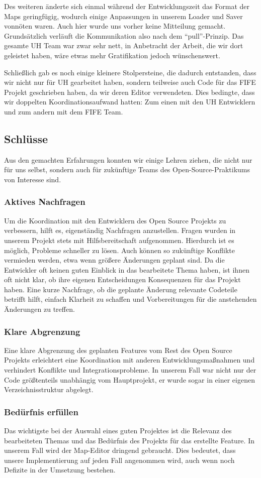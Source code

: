 Des weiteren änderte sich einmal während der Entwicklungszeit das Format der
Maps geringfügig, wodurch einige Anpassungen in unserem Loader und Saver vonnöten
waren. Auch hier wurde uns vorher keine Mitteilung gemacht. Grundsätzlich
verläuft die Kommunikation also nach dem ``pull''-Prinzip. Das gesamte UH Team
war zwar sehr nett, in Anbetracht der Arbeit, die wir dort geleistet haben, wäre
etwas mehr Gratifikation jedoch wünschenswert.

Schließlich gab es noch einige kleinere Stolpersteine, die dadurch entstanden,
dass wir nicht nur für UH gearbeitet haben, sondern teilweise auch Code
für das FIFE Projekt geschrieben haben, da wir deren Editor verwendeten.
Dies bedingte, dass wir doppelten Koordinationsaufwand hatten: Zum einen mit
den UH Entwicklern und zum andern mit dem FIFE Team.


\subsection{Schlüsse}
Aus den gemachten Erfahrungen konnten wir einige Lehren ziehen, die nicht nur
für uns selbst, sondern auch für zukünftige Teams des Open-Source-Praktikums
von Interesse sind.

\subsubsection{Aktives Nachfragen}
Um die Koordination mit den Entwicklern des Open Source Projekts zu verbessern,
hilft es, eigenständig Nachfragen anzustellen. Fragen wurden in
unserem Projekt stets mit Hilfsbereitschaft aufgenommen. Hierdurch ist es möglich,
Probleme schneller zu lösen. Auch können so zukünftige Konflikte vermieden werden,
etwa wenn größere Änderungen geplant sind. Da die Entwickler oft keinen guten
Einblick in das bearbeitete Thema haben, ist ihnen oft nicht klar, ob ihre eigenen
Entscheidungen Konsequenzen für das Projekt haben. Eine kurze Nachfrage, ob die
geplante Änderung relevante Codeteile betrifft hilft, einfach Klarheit zu schaffen
und Vorbereitungen für die anstehenden Änderungen zu treffen.

\subsubsection{Klare Abgrenzung}
Eine klare Abgrenzung des geplanten Features vom Rest des Open Source Projekts
erleichtert eine Koordination mit anderen Entwicklungsmaßnahmen und verhindert
Konflikte und Integrationsprobleme. In unserem Fall war nicht nur der Code
größtenteils unabhängig vom Hauptprojekt, er wurde sogar in einer eigenen
Verzeichnisstruktur abgelegt.

\subsubsection{Bedürfnis erfüllen}
Das wichtigste bei der Auswahl eines guten Projektes ist die Relevanz des
bearbeiteten Themas und das Bedürfnis des Projekts für das erstellte Feature.
In unserem Fall wird der Map-Editor dringend gebraucht. Dies bedeutet, dass
unsere Implementierung auf jeden Fall angenommen wird, auch wenn noch Defizite
in der Umsetzung bestehen.


